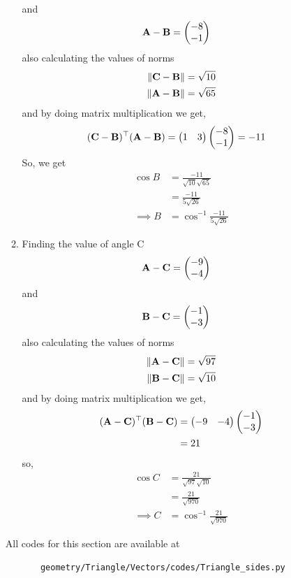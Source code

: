 \documentclass[10pt]{book}
\begin{document}
\begin{enumerate}[label=\thesection.\arabic*.,ref=\thesection.\theenumi]
\begin{enumerate}
\begin{align}
\end{align}
and 
\begin{align}
 \mathbf{A}-\mathbf{B} &= \begin{pmatrix}-8\\-1\end{pmatrix}
\end{align}
also calculating the values of norms
\begin{align}
 \left\lVert\mathbf{C}-\mathbf{B}\right\rVert &= \sqrt{10}\\
 \left\lVert\mathbf{A}-\mathbf{B}\right\rVert &= \sqrt{65}
\end{align}
and by doing matrix multiplication we get,
\begin{align}
\begin{split}
 (\mathbf{C}-\mathbf{B})^{\top}(\mathbf{A}-\mathbf{B}) &= \begin{pmatrix}1&3\end{pmatrix}\begin{pmatrix}-8\\-1\end{pmatrix} = -11
\end{split}
\end{align}
So, we get 
\begin{align}
	\cos{B} &= \frac{-11}{\sqrt{10} \sqrt{65}}\\
 &= \frac{-11}{5\sqrt{26}}\\
 \implies B& = \cos^{-1}{\frac{-11}{5\sqrt{26}}}
\end{align}

\item Finding the value of angle C
\begin{align}
 \mathbf{A}-\mathbf{C} &=\begin{pmatrix}-9\\-4\end{pmatrix}
\end{align}
and 
\begin{align}
 \mathbf{B}-\mathbf{C} &= \begin{pmatrix}-1\\-3\end{pmatrix}
\end{align}
also calculating the values of norms
\begin{align}
 \left\lVert\mathbf{A}-\mathbf{C}\right\rVert &= \sqrt{97}\\
	\left\lVert\mathbf{B}-\mathbf{C}\right\rVert &= \sqrt{10}
\end{align}
and by doing matrix multiplication we get,
\begin{align}
\begin{split}
 (\mathbf{A}-\mathbf{C})^{\top}(\mathbf{B}-\mathbf{C}) &= \begin{pmatrix}-9&-4\end{pmatrix}\begin{pmatrix}-1\\-3\end{pmatrix}\\
 &= 21
\end{split}
\end{align}
so, 
\begin{align}
\cos{C} &= \frac{21}{{\sqrt{97}} \sqrt{10}}\\
 &= \frac{21}{\sqrt{970}}\\
\implies C &= \cos^{-1}{\frac{21}{\sqrt{970}}}
\end{align}
\end{enumerate} 
All codes for this section are available at 
\begin{lstlisting}
       geometry/Triangle/Vectors/codes/Triangle_sides.py
\end{lstlisting}
\end{enumerate}
\backmatter
\appendix
\latexprintindex
\end{document}
